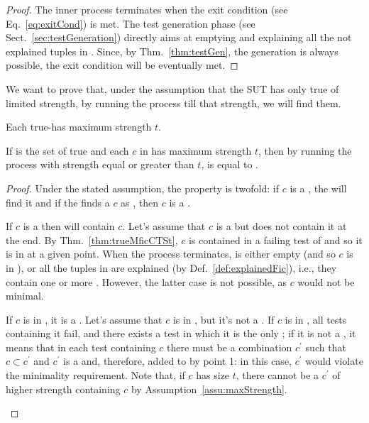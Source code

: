 \begin{tikzborder}{\cite{Gargantini16:validation}}
\begin{tikzborder}{\cite{gargantini_combinatorial_2017}}
\begin{tikzborder}{\cite{garn2019}}
\begin{tikzborder}{\cite{arcaini2019achieving}}
\begin{tikzborder}{}
\begin{proof}
	The inner process \mixt terminates when the exit condition (see Eq.~\ref{eq:exitCond}) is met. The test generation phase (see Sect.~\ref{sec:testGeneration}) directly aims at emptying \ut and explaining all the not explained tuples in \ft. Since, by Thm.~\ref{thm:testGen}, the generation is always possible, the exit condition will be eventually met.
\end{proof}

We want to prove that, under the assumption that the SUT has only true \mfics of limited strength, by running the process till that strength, we will find them.

\begin{assumption}\label{assu:maxStrength}
	Each true-\mfic has maximum strength $t$.
\end{assumption}

\begin{thm}\label{thm:trueMficsFound}
	If \trueMficsSet is the set of true \mfics and each $c$ in \trueMficsSet has maximum strength $t$, then by running the process with strength equal or greater than $t$, \isoMficsSet is equal to \trueMficsSet.
\end{thm}

\begin{proof}
	Under the stated assumption, the property is twofold: if $c$ is a \truemfic, the \mix will find it and if the \mix finds a $c$ as \mfic, then $c$ is a \truemfic.
	\begin{compactenum}
		\item If $c$ is a \truemfic then \isoMficsSet will contain $c$. Let's assume that $c$ is a \truemfic but \isoMficsSet does not contain it at the end. By Thm.~\ref{thm:trueMficCTSt}, $c$ is contained in a failing test of \ts and so it is in \ft at a given point. When the process terminates, \ft is either empty (and so $c$ is in \isoMficsSet), or all the tuples in \ft are explained (by Def.~\ref{def:explainedFic}), i.e., they contain one or more \isoMfic. However, the latter case is not possible, as $c$ would not be minimal.
		\item If $c$ is in \isoMficsSet, it is a \truemfic. Let's assume that $c$ is in \isoMficsSet, but it's not a \truemfic. If $c$ is in \isoMficsSet, all tests containing it fail, and there exists a test in which it is the only \mfic; if it is not a \truemfic, it means that in each test containing $c$ there must be a combination $c^\prime$ such that $c \subset c^\prime$ and $c^\prime$ is a \truemfic and, therefore, added to \isoMficsSet by point 1: in this case, $c^\prime$ would violate the minimality requirement. Note that, if $c$ has size $t$, there cannot be a \truemfic $c^\prime$ of higher strength containing $c$ by Assumption~\ref{assu:maxStrength}.
	\end{compactenum}
\end{proof}
\end{tikzborder}


\end{tikzborder}
\end{tikzborder}
\end{tikzborder}
\end{tikzborder}

